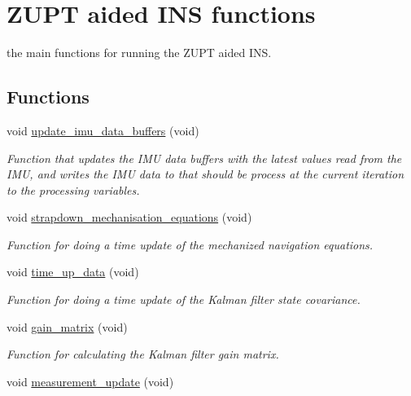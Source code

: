 \hypertarget{group__main__func}{
\section{\-Z\-U\-P\-T aided \-I\-N\-S functions}
\label{group__main__func}
}


the main functions for running the \-Z\-U\-P\-T aided \-I\-N\-S.  


\subsection*{\-Functions}
\begin{DoxyCompactItemize}
\item 
void \hyperlink{group__main__func_gaae1bbd924940610e1709300d40ca5a0f}{update\-\_\-imu\-\_\-data\-\_\-buffers} (void)
\begin{DoxyCompactList}\small\item\em \-Function that updates the \-I\-M\-U data buffers with the latest values read from the \-I\-M\-U, and writes the \-I\-M\-U data to that should be process at the current iteration to the processing variables. \end{DoxyCompactList}\item 
void \hyperlink{group__main__func_ga9169808fbcb9f517deb908960a69ca7a}{strapdown\-\_\-mechanisation\-\_\-equations} (void)
\begin{DoxyCompactList}\small\item\em \-Function for doing a time update of the mechanized navigation equations. \end{DoxyCompactList}\item 
void \hyperlink{group__main__func_gac80ad2aa648edb47edb8f62883cb2a7d}{time\-\_\-up\-\_\-data} (void)
\begin{DoxyCompactList}\small\item\em \-Function for doing a time update of the \-Kalman filter state covariance. \end{DoxyCompactList}\item 
void \hyperlink{group__main__func_ga75c4a936b2db01f930ba89babb822f69}{gain\-\_\-matrix} (void)
\begin{DoxyCompactList}\small\item\em \-Function for calculating the \-Kalman filter gain matrix. \end{DoxyCompactList}\item 
void \hyperlink{group__main__func_gaa1673f6cf928e97c6372c56eddb4cc72}{measurement\-\_\-update} (void)

\end{DoxyCompactItemize}
